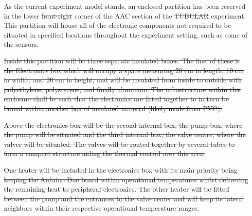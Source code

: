 \documentclass[a4paper,12pt,twoside, final]{article}
\providecommand{\DIFaddtex}[1]{{\protect\color{blue}\uwave{#1}}} %
\providecommand{\DIFdeltex}[1]{{\protect\color{red}\sout{#1}}}                      %
\providecommand{\DIFaddbegin}{} %
\providecommand{\DIFaddend}{} %
\providecommand{\DIFdelbegin}{} %
\providecommand{\DIFdelend}{} %
\providecommand{\DIFadd}[1]{\texorpdfstring{\DIFaddtex{#1}}{#1}} %
\providecommand{\DIFdel}[1]{\texorpdfstring{\DIFdeltex{#1}}{}} %
\newcommand{\DIFscaledelfig}{0.5}
\newlength{\DIFdelgraphicswidth} %
\newlength{\DIFdelgraphicsheight} %
\newcommand{\DIFaddincludegraphics}[2][]{{\color{blue}\fbox{\DIFOincludegraphics[#1]{#2}}}} %
\newcommand{\DIFdelincludegraphics}[2][]{%
\sbox{\DIFdelgraphicsbox}{\DIFOincludegraphics[#1]{#2}}%
\settoboxwidth{\DIFdelgraphicswidth}{\DIFdelgraphicsbox} %
\settoboxtotalheight{\DIFdelgraphicsheight}{\DIFdelgraphicsbox} %
\scalebox{\DIFscaledelfig}{%
\parbox[b]{\DIFdelgraphicswidth}{\usebox{\DIFdelgraphicsbox}\\[-\baselineskip] \rule{\DIFdelgraphicswidth}{0em}}\llap{\resizebox{\DIFdelgraphicswidth}{\DIFdelgraphicsheight}{%
\setlength{\unitlength}{\DIFdelgraphicswidth}%
\begin{picture}(1,1)%
\thicklines\linethickness{2pt} %
{\color[rgb]{1,0,0}\put(0,0){\framebox(1,1){}}}%
{\color[rgb]{1,0,0}\put(0,0){\line( 1,1){1}}}%
{\color[rgb]{1,0,0}\put(0,1){\line(1,-1){1}}}%
\end{picture}%
}\hspace*{3pt}}} %
} %
\DeclareRobustCommand{\DIFaddbegin}{\DIFOaddbegin \let\includegraphics\DIFaddincludegraphics} %
\DeclareRobustCommand{\DIFaddend}{\DIFOaddend \let\includegraphics\DIFOincludegraphics} %
\DeclareRobustCommand{\DIFdelbegin}{\DIFOdelbegin \let\includegraphics\DIFdelincludegraphics} %
\DeclareRobustCommand{\DIFdelend}{\DIFOaddend \let\includegraphics\DIFOincludegraphics} %
\begin{document}
\DIFdelend As the current experiment model stands, an enclosed partition has been reserved in the lower \DIFdelbegin \DIFdel{front-right }\DIFdelend \DIFaddbegin \DIFadd{front left-hand }\DIFaddend corner of the AAC section of the \DIFdelbegin \DIFdel{TUBULAR }\DIFdelend experiment. This partition will house all of the electronic components not required to be situated in specified locations throughout the experiment setting, such as some of the sensors.

\DIFdelbegin \DIFdel{Inside this partition will be three separate insulated boxes. The first of these is the Electronics box which will occupy a space measuring 20 cm in length, 10 cm in width, and 20 cm in height, and will be insulated from inside to outside with polyethylene, polystyrene, and finally aluminum. The infrastructure within this enclosure shall be such that the electronics are fitted together to in turn be bound within another box of insulated material (likely made from PVC). 
}%

\DIFdel{Above the electronics box will be the second internal box, the pump box, where the pump will be situated and the third internal box, the valve centre, where the valves will be situated. The valves will be routed together by several tubes to form a compact structure aiding the thermal control over this area. 
}%

\DIFdel{One heater will be included in the electronics box with its main priority being keeping the Arduino Due board within operational temperatures whilst delivering the remaining heat to peripheral electronics. The other heater will be fitted between the pump and the entrances to the valve center and will keep its lateral neighbors within their respective operational temperature ranges.
}%
\end{document}
